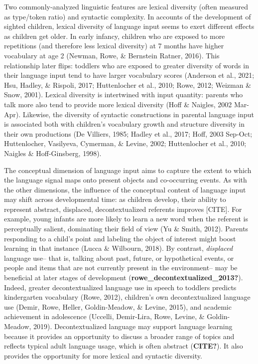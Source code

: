 \documentclass[
  man,floatsintext]{apa6}
\begin{document}
Two commonly-analyzed linguistic features are lexical diversity (often measured as type/token ratio) and syntactic complexity. In accounts of the development of sighted children, lexical diversity of language input seems to exert different effects as children get older. In early infancy, children who are exposed to more repetitions (and therefore less lexical diversity) at 7 months have higher vocabulary at age 2 (Newman, Rowe, \& Bernstein Ratner, 2016). This relationship later flips: toddlers who are exposed to greater diversity of words in their language input tend to have larger vocabulary scores (Anderson et al., 2021; Hsu, Hadley, \& Rispoli, 2017; Huttenlocher et al., 2010; Rowe, 2012; Weizman \& Snow, 2001). Lexical diversity is intertwined with input quantity: parents who talk more also tend to provide more lexical diversity (Hoff \& Naigles, 2002 Mar-Apr). Likewise, the diversity of syntactic constructions in parental language input is associated both with children's vocabulary growth and structure diversity in their own productions (De Villiers, 1985; Hadley et al., 2017; Hoff, 2003 Sep-Oct; Huttenlocher, Vasilyeva, Cymerman, \& Levine, 2002; Huttenlocher et al., 2010; Naigles \& Hoff-Ginsberg, 1998).

The conceptual dimension of language input aims to capture the extent to which the language signal maps onto present objects and co-occurring events. As with the other dimensions, the influence of the conceptual content of language input may shift across developmental time: as children develop, their ability to represent abstract, displaced, decontextualized referents improves {[}CITE{]}. For example, young infants are more likely to learn a new word when the referent is perceptually salient, dominating their field of view (Yu \& Smith, 2012). Parents responding to a child's point and labeling the object of interest might boost learning in that instance (Lucca \& Wilbourn, 2018). By contrast, \emph{displaced} language use-- that is, talking about past, future, or hypothetical events, or people and items that are not currently present in the environment-- may be beneficial at later stages of development (\textbf{rowe\_decontextualized\_2013?}). Indeed, greater decontextualized language use in speech to toddlers predicts kindergarten vocabulary (Rowe, 2012), children's own decontextualized language use (Demir, Rowe, Heller, Goldin-Meadow, \& Levine, 2015), and academic achievement in adolescence (Uccelli, Demir-Lira, Rowe, Levine, \& Goldin-Meadow, 2019). Decontextualized language may support language learning because it provides an opportunity to discuss a broader range of topics and reflects typical adult language usage, which is often abstract (\textbf{CITE?}). It also provides the opportunity for more lexical and syntactic diversity.
\end{document}

